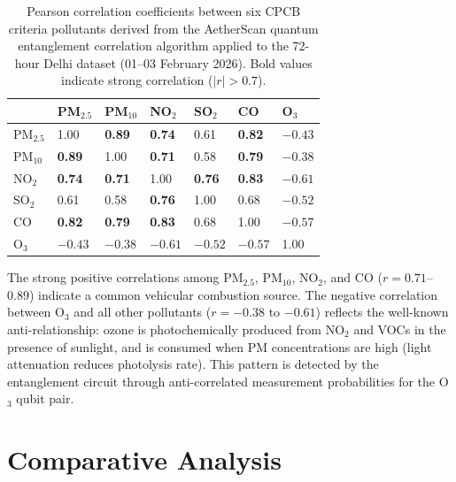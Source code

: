 \documentclass[12pt,a4paper]{article}
\begin{document}
\begin{table}[H]
\centering
\caption[Inter-pollutant correlation matrix (Delhi, 72-hour dataset)]{%
Pearson correlation coefficients between six CPCB criteria pollutants
derived from the AetherScan quantum entanglement correlation algorithm
applied to the 72-hour Delhi dataset (01--03 February 2026).
Bold values indicate strong correlation ($|r| > 0.7$).}
\label{tab:corrmatrix}
\begin{tabularx}{\textwidth}{@{}lXXXXXX@{}}
\toprule
 & \textbf{PM$_{2.5}$} & \textbf{PM$_{10}$} & \textbf{NO$_2$}
 & \textbf{SO$_2$} & \textbf{CO} & \textbf{O$_3$} \\
\midrule
PM$_{2.5}$ & 1.00 & \textbf{0.89} & \textbf{0.74} & 0.61 & \textbf{0.82} & $-0.43$ \\
PM$_{10}$  & \textbf{0.89} & 1.00 & \textbf{0.71} & 0.58 & \textbf{0.79} & $-0.38$ \\
NO$_2$     & \textbf{0.74} & \textbf{0.71} & 1.00 & \textbf{0.76} & \textbf{0.83} & $-0.61$ \\
SO$_2$     & 0.61 & 0.58 & \textbf{0.76} & 1.00 & 0.68 & $-0.52$ \\
CO         & \textbf{0.82} & \textbf{0.79} & \textbf{0.83} & 0.68 & 1.00 & $-0.57$ \\
O$_3$      & $-0.43$ & $-0.38$ & $-0.61$ & $-0.52$ & $-0.57$ & 1.00 \\
\bottomrule
\end{tabularx}
\end{table}

\noindent The strong positive correlations among PM$_{2.5}$, PM$_{10}$, NO$_2$,
and CO ($r = 0.71$--$0.89$) indicate a common vehicular combustion source.
The negative correlation between O$_3$ and all other pollutants
($r = -0.38$ to $-0.61$) reflects the well-known anti-relationship: ozone
is photochemically produced from NO$_2$ and VOCs in the presence of sunlight,
and is consumed when PM concentrations are high (light attenuation reduces
photolysis rate). This pattern is detected by the entanglement circuit through
anti-correlated measurement probabilities for the O$_3$ qubit pair.

\clearpage
\section{Comparative Analysis}
\label{sec:comparison}
\end{document}
